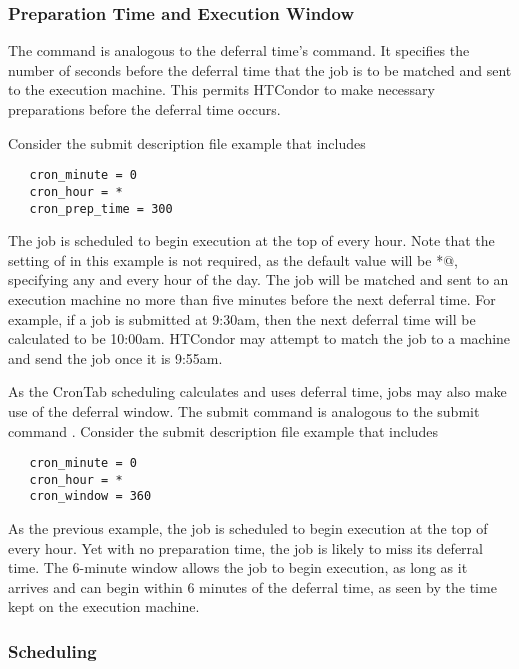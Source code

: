 \subsubsection{Preparation Time and Execution Window}
\label{sec:CronTab-PrepTime}

The  command
is analogous to the deferral time's  command. 
It specifies the number of seconds before the deferral time
that the job is to be matched and sent to the execution machine. 
This permits HTCondor to
make necessary preparations before the deferral time occurs. 

Consider the submit description file example that includes 
\begin{verbatim}
   cron_minute = 0
   cron_hour = *
   cron_prep_time = 300
\end{verbatim}
The job is scheduled to begin execution at the top of every hour.
Note that the setting of  in this example
is not required, as the default value will be \verb@*@, 
specifying any and every hour of the day.
The job will be matched and sent to an execution machine 
no more than five minutes before the next deferral time. 
For example, if a job is submitted at 9:30am, then the 
next deferral time will be calculated to be 10:00am.
HTCondor may attempt to match the job to a machine and send the job
once it is 9:55am.

As the CronTab scheduling calculates and uses deferral time,
jobs may also make use of the deferral window.
The submit command  is analogous to
the submit command .
Consider the submit description file example that includes 
\begin{verbatim}
   cron_minute = 0
   cron_hour = *
   cron_window = 360
\end{verbatim}
As the previous example, the job is scheduled to begin execution
at the top of every hour.
Yet with no preparation time, the job is likely to miss
its deferral time.
The 6-minute window allows the job to begin execution,
as long as it arrives and can begin within 6 minutes of
the deferral time,
as seen by the time kept on the execution machine.

\subsubsection{Scheduling}
\label{sec:crontab-scheduling}

